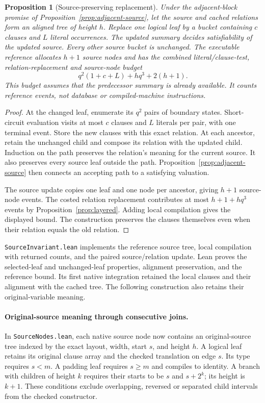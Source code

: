 \documentclass[11pt,a4paper]{article}
\numberwithin{equation}{section}
\theoremstyle{plain}
\newtheorem{proposition}[lemma]{Proposition}
\theoremstyle{definition}
\theoremstyle{remark}
\begin{document}
\begin{proposition}[Source-preserving replacement]
\label{prop:source-update}
Under the adjacent-block promise of Proposition~\ref{prop:adjacent-source}, let the source and cached relations form an aligned tree of height $h$. Replace one logical leaf by a bucket containing $c$ clauses and $L$ literal occurrences. The updated summary decides satisfiability of the updated source. Every other source bucket is unchanged. The executable reference allocates $h+1$ source nodes and has the combined literal/clause-test, relation-replacement and source-node budget
\[
q^2(1+c+L)+hq^3+2(h+1).
\]
This budget assumes that the predecessor summary is already available. It counts reference events, not database or compiled-machine instructions.
\end{proposition}

\begin{proof}
At the changed leaf, enumerate its $q^2$ pairs of boundary states. Short-circuit evaluation visits at most $c$ clauses and $L$ literals per pair, with one terminal event. Store the new clauses with this exact relation. At each ancestor, retain the unchanged child and compose its relation with the updated child. Induction on the path preserves the relation's meaning for the current source. It also preserves every source leaf outside the path. Proposition~\ref{prop:adjacent-source} then connects an accepting path to a satisfying valuation.

The source update copies one leaf and one node per ancestor, giving $h+1$ source-node events. The costed relation replacement contributes at most $h+1+hq^3$ events by Proposition~\ref{prop:layered}. Adding local compilation gives the displayed bound. The construction preserves the clauses themselves even when their relation equals the old relation.
\end{proof}

\texttt{SourceInvariant.lean} implements the reference source tree, local compilation with returned counts, and the paired source/relation update. Lean proves the selected-leaf and unchanged-leaf properties, alignment preservation, and the reference bound. Its first native integration retained the local clauses and their alignment with the cached tree. The following construction also retains their original-variable meaning.

\paragraph{Original-source meaning through consecutive joins.}
In \texttt{SourceNodes.lean}, each native source node now contains an original-source tree indexed by the exact layout, width, start $s$, and height $h$. A logical leaf retains its original clause array and the checked translation on edge $s$. Its type requires $s<m$. A padding leaf requires $s\geq m$ and compiles to identity. A branch with children of height $k$ requires their starts to be $s$ and $s+2^k$; its height is $k+1$. These conditions exclude overlapping, reversed or separated child intervals from the checked constructor.
\end{document}
